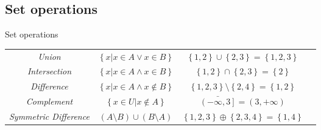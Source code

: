\documentclass[a4paper]{article}
\begin{document}
\subsection{Set operations}

\begin{parag}{Set operations}
    \begin{center}
    \begin{tabularx}{\linewidth}{|>{\hsize}C>{\hsize}C>{\hsize}C>{\hsize}X|}
        \hline
         &  &  &   \\
        \hline
        \textit{Union} & $\left\{x | x \in A \lor x \in B\right\}$ & $\left\{1, 2\right\} \cup \left\{2, 3\right\} = \left\{1, 2, 3\right\}$ &  \\
        \hline
        \textit{Intersection} & $\left\{x | x \in A \land x \in B\right\}$ & $\left\{1, 2\right\} \cap \left\{2, 3\right\} = \left\{2\right\}$ &   \\
        \hline
        \textit{Difference} & $\left\{x | x \in A \land x \not\in B\right\}$ & $\left\{1, 2, 3\right\} \setminus \left\{2, 4\right\} = \left\{1, 2\right\}$&   \\
        \hline
        \textit{Complement} & $\left\{x \in U | x \not \in A\right\}$ & $\bar{\left(-\infty, 3\right]} = \left(3, +\infty\right)$ &   \\
        \hline
        \textit{Symmetric Difference} & $\left(A \setminus B\right) \cup \left(B \setminus A\right)$ & $\left\{1, 2, 3\right\} \oplus \left\{2, 3, 4\right\} = \left\{1, 4\right\}$ &   \\
        \hline
    \end{tabularx}
    \end{center}


\end{parag}
\end{document}
